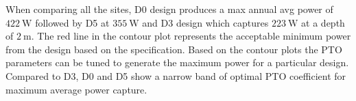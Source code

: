\documentclass[10pt,journal,a4paper,twoside]{./IMEJ}
\begin{document}
When comparing all the sites, D0 design produces a max annual avg power of \(422~\mathrm{W}\) followed by D5 at \(355~\mathrm{W}\) and D3 design which captures \(223~\mathrm{W}\) at a depth of \(2~\mathrm{m}\). The red line in the contour plot represents the acceptable minimum power from the design based on the specification. Based on the contour plots the PTO parameters can be tuned to generate the maximum power for a particular design. Compared to D3, D0 and D5 show a narrow band of optimal PTO coefficient for maximum average power capture.

\end{document}
